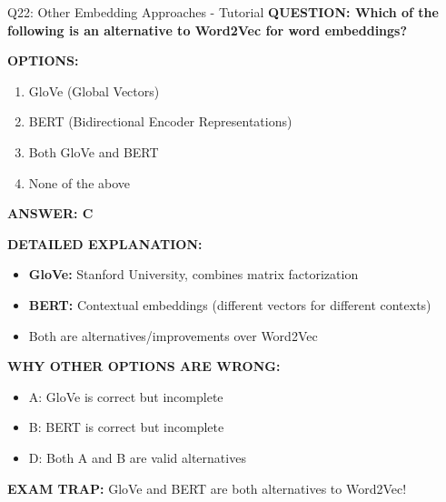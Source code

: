 \documentclass[8pt]{beamer}
\begin{document}
	\begin{frame}{Q22: Other Embedding Approaches - Tutorial}
		\fontsize{6.5}{7.5}\selectfont
		\textbf{QUESTION: Which of the following is an alternative to Word2Vec for word embeddings?}
		
		\vspace{0.1cm}
		\textbf{OPTIONS:}
		\begin{enumerate}
			\item GloVe (Global Vectors)
			\item BERT (Bidirectional Encoder Representations)
			\item Both GloVe and BERT
			\item None of the above
		\end{enumerate}
		
		\vspace{0.1cm}
		\textcolor{myblue}{\textbf{ANSWER: C}}
		
		\vspace{0.1cm}
		\textbf{DETAILED EXPLANATION:}
		\begin{itemize}
			\item \textbf{GloVe:} Stanford University, combines matrix factorization
			\item \textbf{BERT:} Contextual embeddings (different vectors for different contexts)
			\item Both are alternatives/improvements over Word2Vec
		\end{itemize}
		
		\vspace{0.1cm}
		\textcolor{myred}{\textbf{WHY OTHER OPTIONS ARE WRONG:}}
		\begin{itemize}
			\item \textcolor{myred}{A:} GloVe is correct but incomplete
			\item \textcolor{myred}{B:} BERT is correct but incomplete
			\item \textcolor{myred}{D:} Both A and B are valid alternatives
		\end{itemize}
		
		\textcolor{myred}{\textbf{EXAM TRAP:}} GloVe and BERT are \textcolor{myblue}{both alternatives} to Word2Vec!
	\end{frame}
	
\end{document}
